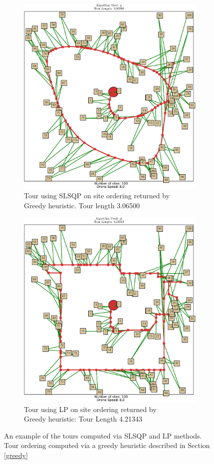 \documentclass[conference]{IEEEtran}
\begin{document}
\begin{figure}
\centering
\begin{subfigure}[b]{0.55\textwidth}
  \includegraphics[width=0.8\columnwidth]{img/out1.pdf}
  \caption{Tour using SLSQP on site ordering  returned by \\ Greedy heuristic. Tour length 3.06500}
\end{subfigure}
\vspace{0.3cm}

\begin{subfigure}[b]{0.55\textwidth}
   \includegraphics[width=0.8\columnwidth]{img/out2.pdf}
   \caption{Tour using LP on site ordering returned by \\ Greedy heuristic: Tour Length 4.21343}
 \end{subfigure}
   \caption{An example of the tours computed via SLSQP and LP methods. Tour ordering computed via a greedy heuristic described in Section \ref{greedy}}
   \label{fig:lpslsqpcompare}
\end{figure}
\end{document}
